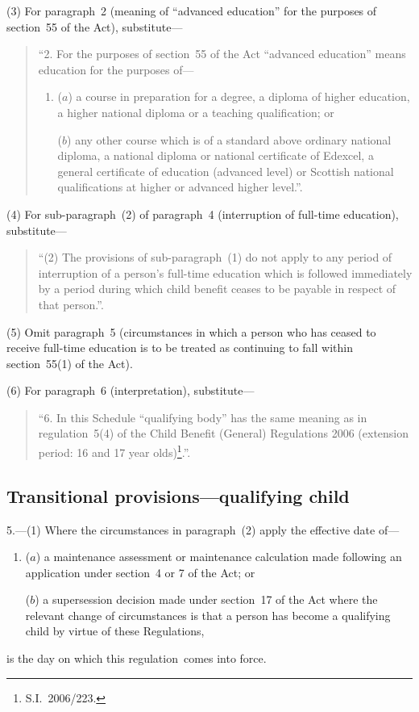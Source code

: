 \documentclass[12pt,a4paper]{article}
\begin{document}
(3) For paragraph~2 (meaning of “advanced education” for the purposes of section~55 of the Act), substitute—
\begin{quotation}
“2.  For the purposes of section~55 of the Act “advanced education” means education for the purposes of—
\begin{enumerate}\item[]
($a$) a course in preparation for a degree, a diploma of higher education, a higher national diploma or a teaching qualification; or

($b$) any other course which is of a standard above ordinary national diploma, a national diploma or national certificate of Edexcel, a general certificate of education (advanced level) or Scottish national qualifications at higher or advanced higher level.”.
\end{enumerate}
\end{quotation}

(4) For sub-paragraph~(2) of paragraph~4 (interruption of full-time education), substitute—
\begin{quotation}
“(2) The provisions of sub-paragraph~(1) do not apply to any period of interruption of a person’s full-time education which is followed immediately by a period during which child benefit ceases to be payable in respect of that person.”.
\end{quotation}

(5) Omit paragraph~5 (circumstances in which a person who has ceased to receive full-time education is to be treated as continuing to fall within section~55(1) of the Act).

(6) For paragraph~6 (interpretation), substitute—
\begin{quotation}
“6.  In this Schedule “qualifying body” has the same meaning as in regulation~5(4) of the Child Benefit (General) Regulations 2006 (extension period: 16 and 17 year olds)\footnote{S.I.~2006/223.}.”.
\end{quotation}

\subsection[5. Transitional provisions---qualifying child]{Transitional provisions---qualifying child}

5.---(1)  Where the circumstances in paragraph~(2) apply the effective date of—
\begin{enumerate}\item[]
($a$) a maintenance assessment or maintenance calculation made following an application under section~4 or 7 of the Act; or

($b$) a supersession decision made under section~17 of the Act where the relevant change of circumstances is that a person has become a qualifying child by virtue of these Regulations,
\end{enumerate}
is the day on which this regulation~comes into force.
\end{document}
